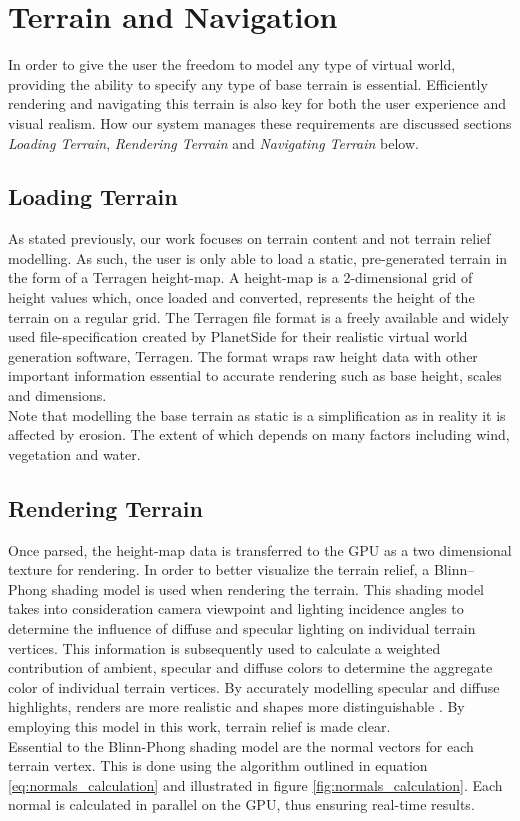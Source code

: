\section{Terrain and Navigation}

In order to give the user the freedom to model any type of virtual world, providing the ability to specify any type of base terrain is essential. Efficiently rendering and navigating this terrain is also key for both the user experience and visual realism. How our system manages these requirements are discussed sections \textit{Loading Terrain}, \textit{Rendering Terrain} and \textit{Navigating Terrain} below.

\subsection{Loading Terrain}

As stated previously, our work focuses on terrain content and not terrain relief modelling. As such, the user is only able to load a static, pre-generated terrain in the form of a Terragen height-map. A height-map is a 2-dimensional grid of height values which, once loaded and converted, represents the height of the terrain on a regular grid. The Terragen file format is a freely available and widely used file-specification created by PlanetSide \protect\footnotemark {} for their realistic virtual world generation software, Terragen. The format wraps raw height data with other important information essential to accurate rendering such as base height, scales and dimensions.\\
Note that modelling the base terrain as static is a simplification as in reality it is affected by erosion. The extent of which depends on many factors including wind, vegetation and water.

\subsection{Rendering Terrain}

Once parsed, the height-map data is transferred to the GPU as a two dimensional texture for rendering. In order to better visualize the terrain relief, a Blinn–Phong shading model is used when rendering the terrain.
This shading model takes into consideration camera viewpoint and lighting incidence angles to determine the influence of diffuse and specular lighting on individual terrain vertices. This information is subsequently used to calculate a weighted contribution of ambient, specular and diffuse colors to determine the aggregate color of individual terrain vertices. By accurately modelling specular and diffuse highlights, renders are more realistic and shapes more distinguishable \citep{Blinn}. By employing this model in this work, terrain relief is made clear.\\
Essential to the Blinn-Phong shading model are the normal vectors for each terrain vertex. This is done using the algorithm outlined in equation \ref{eq:normals_calculation} and illustrated in figure \ref{fig:normals_calculation}. Each normal is calculated in parallel on the GPU, thus ensuring real-time results.


